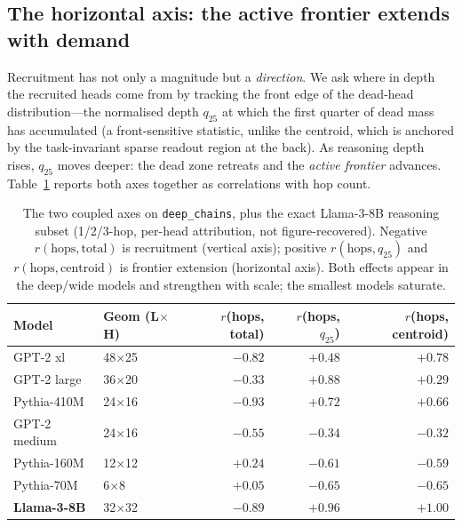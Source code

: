 \documentclass[11pt]{article}
\begin{document}
\subsection{The horizontal axis: the active frontier extends with
demand}\label{sec:frontier}
Recruitment has not only a magnitude but a \emph{direction}. We ask where in
depth the recruited heads come from by tracking the front edge of the
dead-head distribution---the normalised depth $q_{25}$ at which the first
quarter of dead mass has accumulated (a front-sensitive statistic, unlike the
centroid, which is anchored by the task-invariant sparse readout region at the
back). As reasoning depth rises, $q_{25}$ moves deeper: the dead zone retreats
and the \emph{active frontier} advances. Table~\ref{tab:twoaxis} reports both
axes together as correlations with hop count.

\begin{table}[h]
\centering
\caption{The two coupled axes on \texttt{deep\_chains}, plus the exact
Llama-3-8B reasoning subset (1/2/3-hop, per-head attribution, not
figure-recovered). Negative $r(\text{hops},\text{total})$ is recruitment
(vertical axis); positive $r(\text{hops},q_{25})$ and
$r(\text{hops},\text{centroid})$ is frontier extension (horizontal axis).
Both effects appear in the deep/wide models and strengthen with scale; the
smallest models saturate.}
\label{tab:twoaxis}
\small
\begin{tabular}{llrrr}
\toprule
Model & Geom (L$\times$H) & $r$(hops, total) & $r$(hops, $q_{25}$) & $r$(hops, centroid) \\
\midrule
GPT-2 xl & 48$\times$25 & $-0.82$ & $+0.48$ & $+0.78$ \\
GPT-2 large & 36$\times$20 & $-0.33$ & $+0.88$ & $+0.29$ \\
Pythia-410M & 24$\times$16 & $-0.93$ & $+0.72$ & $+0.66$ \\
GPT-2 medium & 24$\times$16 & $-0.55$ & $-0.34$ & $-0.32$ \\
Pythia-160M & 12$\times$12 & $+0.24$ & $-0.61$ & $-0.59$ \\
Pythia-70M & 6$\times$8 & $+0.05$ & $-0.65$ & $-0.65$ \\
\midrule
\textbf{Llama-3-8B} & 32$\times$32 & $\mathbf{-0.89}$ & $\mathbf{+0.96}$ & $\mathbf{+1.00}$ \\
\bottomrule
\end{tabular}
\end{table}
\end{document}
